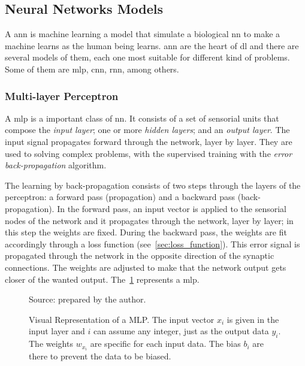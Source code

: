 \subsection{Neural Networks Models}\label{sec:nn_models}

A \gls*{ann} is machine learning a model that simulate a biological \gls*{nn} to make a machine learns as the human being learns.
\gls*{ann} are the heart of \gls*{dl} and there are several models of them, each one most suitable for different kind of problems.
Some of them are \gls*{mlp}, \gls*{cnn}, \gls*{rnn}, among others.

\subsubsection*{Multi-layer Perceptron}

A \gls*{mlp} is a important class of \gls*{nn}. It consists of a set of sensorial units that compose the \emph{input layer}; one or more \emph{hidden layers}; and an \emph{output layer}. The input signal propagates forward through the network, layer by layer. They are used to solving complex problems, with the supervised training with the \emph{error back-propagation} algorithm.

The learning by back-propagation consists of two steps through the layers of the perceptron: a forward pass (propagation) and a backward pass (back-propagation). In the forward pass, an input vector is applied to the sensorial nodes of the network and it propagates through the network, layer by layer; in this step the weights are fixed. During the backward pass, the weights are fit accordingly through a loss function (see~\cref{sec:loss_function}). This error signal is propagated through the network in the opposite direction of the synaptic connections. The weights are adjusted to make that the network output gets closer of the wanted output. The~\cref{fig:mlp} represents a \gls*{mlp}.

\begin{figure}[!htb]
    \centering
    \caption[Visual Representation of a MLP]{Visual Representation of a MLP. The input vector \(x_i\) is given in the input layer and \(i\) can assume any integer, just as the output data \(y_i\). The weights \(w_{x_i}\) are specific for each input data. The bias \(b_i\) are there to prevent the data to be biased.}
    
    
    {\footnotesize Source: prepared by the author.}
    \label{fig:mlp}
\end{figure}


